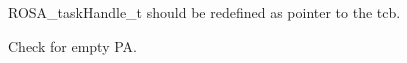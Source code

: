 
\begin{DoxyRefList}
\item[\label{todo__todo000001}%
\Hypertarget{todo__todo000001}%
Global \mbox{\hyperlink{rosa__def_8h_a82d32f422c2987044e833843e7620aa6}{R\+O\+S\+A\+\_\+task\+Handle\+\_\+t}} ]R\+O\+S\+A\+\_\+task\+Handle\+\_\+t should be redefined as pointer to the tcb.  
\item[\label{todo__todo000002}%
\Hypertarget{todo__todo000002}%
Global \mbox{\hyperlink{rosa__ker_8c_aac2dedb3e92a3b1f65054634b3a383ab}{rqsearch}} (void)]Check for empty PA. 
\end{DoxyRefList}